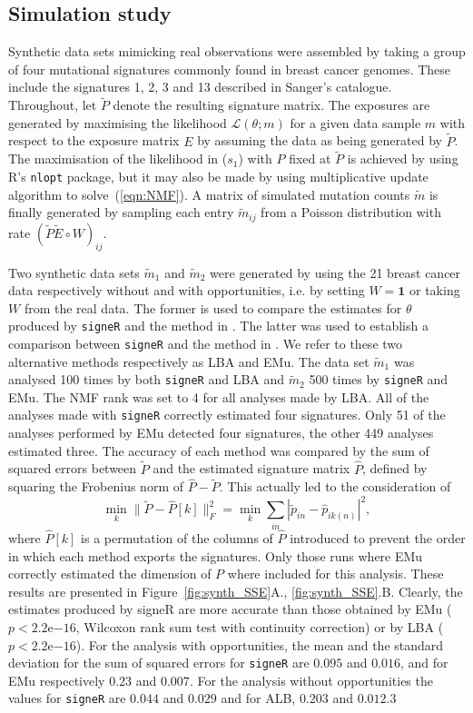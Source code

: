 \documentclass{bioinfo}
\begin{document}
\subsection{Simulation study}
Synthetic data sets mimicking real observations were assembled by
taking a group of four mutational signatures commonly found in breast
cancer genomes. These include the signatures 1, 2, 3 and 13 described
in Sanger's catalogue. Throughout, let $\widetilde P$ denote the
resulting signature matrix.  The exposures are generated by maximising
the likelihood $\mathcal L(\theta; m)$ for a given data sample $m$
with respect to the exposure matrix $E$ by assuming the data as being
generated by $\widetilde P$. The maximisation of the likelihood in
($s_1$) with $P$ fixed at $\widetilde P$ is achieved by using R's 
\texttt{nlopt} package, but it may also be made by using
\cite{LS} multiplicative update algorithm to solve~(\ref{eqn:NMF}). A
matrix of simulated mutation counts $\widetilde m$ is finally
generated by sampling each entry $\widetilde m_{ij}$ from a Poisson
distribution with rate $(\widetilde P\widetilde E\circ W)_{ij}$.

Two synthetic data sets $\widetilde m_1$ and $\widetilde m_2$ were
generated by using the 21 breast cancer data respectively without and
with opportunities, i.e. by setting $W=\mathbf{1}$  or taking $W$
from the real data. The former is used to compare the estimates for 
 $\theta$ produced by
\texttt{signeR} and the method in \cite{A}. The latter was used to
establish a comparison between \texttt{signeR} and the method in
\cite{FICMV}. We refer to these two alternative methods respectively 
as LBA and EMu. The data set $\widetilde m_1$ was analysed 100 times
by both \texttt{signeR} and LBA and $\widetilde m_2$ 500 times by
\texttt{signeR} and EMu. The NMF rank was set to 4 for all analyses
made by LBA. All of the analyses made with \texttt{signeR}
correctly estimated four signatures. Only 51 of the analyses
performed by EMu detected four signatures, the other 449 analyses
estimated three.  The accuracy of each method was compared by the sum
of squared errors between $\widetilde P$ and the estimated signature
matrix $\widehat P$, defined by squaring the Frobenius norm of
$\widehat P - \widetilde P$. This actually led to the consideration of
\[
   \min_k 
   \big\|
       \widetilde P - \widehat P[k]
   \big\|_F^2 
  = 
   \min_k \sum_{in}
     |\widetilde p_{in} - \widehat p_{ik(n)}|^2,
\]
where $\widehat P[k]$ is a permutation of the columns of $\widehat P$
introduced to prevent the order in which each method exports the
signatures. Only those runs where EMu correctly estimated the
dimension of $P$ where included for this analysis. These results are
presented in Figure~\ref{fig:synth_SSE}A., \ref{fig:synth_SSE}.B.
Clearly, the estimates produced by signeR are more accurate than those
obtained by EMu ($p < 2.2$e$-16$, Wilcoxon rank sum test with
continuity correction) or by LBA ($p < 2.2$e$-16$). For the analysis
with opportunities, the mean and the standard deviation for the sum of
squared errors for \texttt{signeR} are $0.095$ and $0.016$, and for
EMu respectively $0.23$ and $0.007$. For the analysis without
opportunities the values for \texttt{signeR} are $0.044$ and $0.029$
and for ALB, $0.203$ and $0.012$.3
\end{document}
